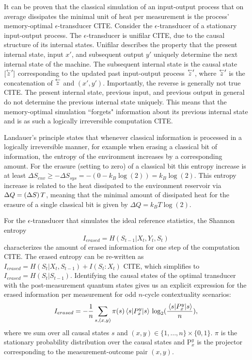 It can be proven that the classical simulation of an input-output process that on average dissipates the minimal unit of heat per measurement is the process' memory-optimal $\epsilon$-transducer CITE. Consider the $\epsilon$-transducer of a stationary input-output process. The $\epsilon$-transducer is unifilar CITE, due to the causal structure of its internal states. Unifilar describes the property that the present internal state, input $x'$, and subsequent output $y'$ uniquely determine the next internal state of the machine. The subsequent internal state is the causal state $[\oset{\leftarrow}{z}']$ corresponding to the updated past input-output process $\oset{\leftarrow}{z}'$, where $\oset{\leftarrow}{z}'$ is the concatenation of $\oset{\leftarrow}{z}$ and $(x',y')$. Importantly, the reverse is generally not true CITE. The present internal state, previous input, and previous output in general do not determine the previous internal state uniquely. This means that the memory-optimal simulation ``forgets" information about its previous internal state and is as such a logically irreversible computation CITE.

Landauer's principle states that whenever classical information is processed in a logically irreversible manner, for example when erasing a classical bit of information, the entropy of the environment increases by a corresponding amount. For the erasure (setting to zero) of a classical bit this entropy increase is at least $\Delta S_{env}\geq -\Delta S_{sys} = -(0-k_B\log(2))=k_B\log(2)$. This entropy increase is related to the heat dissipated to the environment reservoir via $\Delta Q= (\Delta S)\thinspace T$, meaning that the minimal amount of dissipated heat for the erasure of a single classical bit is given by $\Delta Q = k_B T \log(2)$.

For the $\epsilon$-transducer that simulates the ideal reference statistics, the Shannon entropy 
\begin{equation}
I_{erased}=H(S_{t-1}\vert X_t,Y_t,S_t)
\end{equation} 
characterizes the amount of erased information for one step of the computation CITE. The erased entropy can be re-written as $I_{erased}=H(S_t\vert X_t, S_{t-1})+I(S_t:X_t)$ CITE, which simplifies to $I_{erased}=H(S_t\vert S_{t-1})$. Identifying the causal states of the optimal transducer with the post-measurement quantum states gives us an explicit expression for the erased information per measurement for odd $n$-cycle contextuality scenarios:
\begin{equation}
I_{erased}= -\frac{1}{n} \sum_{s,(x,y)} \pi(s) \expval{P_x^y}{s}\thinspace\log_2(\frac{\expval{P_x^y}{s}}{n}),    
\end{equation}
where we sum over all causal states $s$ and $(x,y)\in\{1,\dots,n\}\times\{0,1\}$. $\pi$ is the stationary probability distribution over the causal states and $\text{P}_x^y$ is the projector corresponding to the measurement-outcome pair $(x,y)$.

